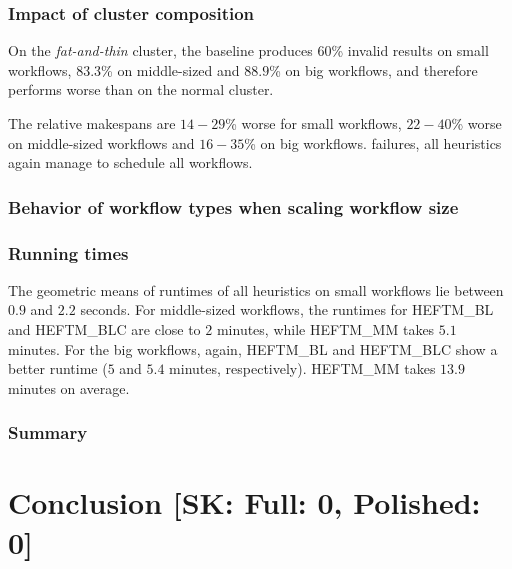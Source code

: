 \documentclass[conference]{IEEEtran}
\newcommand{\algo}[1]{\textsc{#1}}
\newcommand{\heftmm}{\algo{HEFTM\_MM}\xspace}
\newcommand{\heftbl}{\algo{HEFTM\_BL}\xspace}
\newcommand{\heftblc}{\algo{HEFTM\_BLC}\xspace}
\newcommand{\skug}[1]{{\color{blue}[SK: #1]}}
\begin{document}
    \subsubsection{Impact of cluster composition}
    On the {\em fat-and-thin} cluster, the baseline produces $60$\% invalid results on small workflows, $83.3$\% on
    middle-sized and $88.9$\% on big workflows, and therefore performs worse than on the normal cluster.

    The relative makespans are $14-29$\% worse for small workflows, $22-40$\% worse on middle-sized workflows and $16-35$\%
    on big workflows.
    \wrt failures, all heuristics again manage to schedule all workflows.
    \subsubsection{Behavior of workflow types when scaling workflow size}
    \subsubsection{Running times}
    The geometric means of runtimes of all heuristics on small workflows lie between $0.9$ and $2.2$ seconds.
    For middle-sized workflows, the runtimes for \heftbl and \heftblc are close to $2$ minutes, while \heftmm
    takes $5.1$ minutes.
    For the big workflows, again, \heftbl and \heftblc show a better runtime ($5$ and $5.4$ minutes, respectively).
    \heftmm takes $13.9$ minutes on average.
    \subsubsection{Summary}

    \section{Conclusion  \skug{Full: 0, Polished: 0}}

    
    
\end{document}
